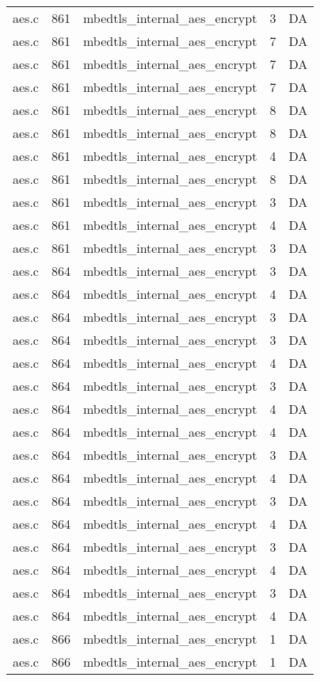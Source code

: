 \begin{table}[h]
{\begin{tabular}{clrrr}
aes.c&861&mbedtls\_internal\_aes\_encrypt&3 &DA\\
aes.c&861&mbedtls\_internal\_aes\_encrypt&7 &DA\\
aes.c&861&mbedtls\_internal\_aes\_encrypt&7 &DA\\
aes.c&861&mbedtls\_internal\_aes\_encrypt&7 &DA\\
aes.c&861&mbedtls\_internal\_aes\_encrypt&8 &DA\\
aes.c&861&mbedtls\_internal\_aes\_encrypt&8 &DA\\
aes.c&861&mbedtls\_internal\_aes\_encrypt&4 &DA\\
aes.c&861&mbedtls\_internal\_aes\_encrypt&8 &DA\\
aes.c&861&mbedtls\_internal\_aes\_encrypt&3 &DA\\
aes.c&861&mbedtls\_internal\_aes\_encrypt&4 &DA\\
aes.c&861&mbedtls\_internal\_aes\_encrypt&3 &DA\\
aes.c&864&mbedtls\_internal\_aes\_encrypt&3 &DA\\
aes.c&864&mbedtls\_internal\_aes\_encrypt&4 &DA\\
aes.c&864&mbedtls\_internal\_aes\_encrypt&3 &DA\\
aes.c&864&mbedtls\_internal\_aes\_encrypt&3 &DA\\
aes.c&864&mbedtls\_internal\_aes\_encrypt&4 &DA\\
aes.c&864&mbedtls\_internal\_aes\_encrypt&3 &DA\\
aes.c&864&mbedtls\_internal\_aes\_encrypt&4 &DA\\
aes.c&864&mbedtls\_internal\_aes\_encrypt&4 &DA\\
aes.c&864&mbedtls\_internal\_aes\_encrypt&3 &DA\\
aes.c&864&mbedtls\_internal\_aes\_encrypt&4 &DA\\
aes.c&864&mbedtls\_internal\_aes\_encrypt&3 &DA\\
aes.c&864&mbedtls\_internal\_aes\_encrypt&4 &DA\\
aes.c&864&mbedtls\_internal\_aes\_encrypt&3 &DA\\
aes.c&864&mbedtls\_internal\_aes\_encrypt&4 &DA\\
aes.c&864&mbedtls\_internal\_aes\_encrypt&3 &DA\\
aes.c&864&mbedtls\_internal\_aes\_encrypt&4 &DA\\
aes.c&866&mbedtls\_internal\_aes\_encrypt&1 &DA\\
aes.c&866&mbedtls\_internal\_aes\_encrypt&1 &DA\\

\end{tabular}}
\end{table}
